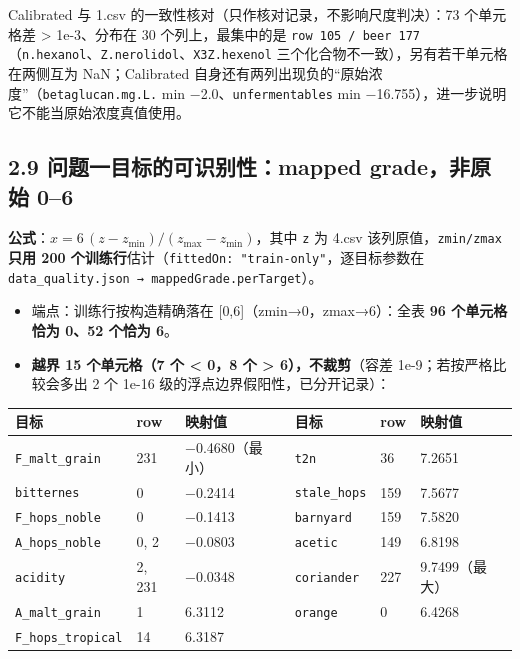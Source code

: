 \documentclass[
  11pt,
]{ctexart}
\newcounter{none} %
\providecommand{\tightlist}{%
  \setlength{\itemsep}{0pt}\setlength{\parskip}{0pt}}
\begin{document}
Calibrated 与 1.csv 的一致性核对（只作核对记录，不影响尺度判决）：73
个单元格差 \textgreater{} 1e-3、分布在 30 个列上，最集中的是
\texttt{row\ 105\ /\allowbreak{}\ beer\ 177}（\texttt{n.hexanol}、\texttt{Z.nerolidol}、\texttt{X3Z.hexenol}
三个化合物不一致），另有若干单元格在两侧互为 NaN；Calibrated
自身还有两列出现负的``原始浓度''（\texttt{betaglucan.\allowbreak{}mg.\allowbreak{}L.\allowbreak{}} min
−2.0、\texttt{unfermentables} min
−16.755），进一步说明它不能当原始浓度真值使用。

\subsection{2.9 问题一目标的可识别性：mapped grade，非原始
0--6}\label{ux95eeux9898ux4e00ux76eeux6807ux7684ux53efux8bc6ux522bux6027mapped-gradeux975eux539fux59cb-06}

\textbf{公式}：\(x = 6\,(z-z_{\min})/(z_{\max}-z_{\min})\)，其中
\texttt{z} 为 4.csv 该列原值，\texttt{zmin/zmax} \textbf{只用 200
个训练行}估计（\texttt{fittedOn:\ "train-only"}，逐目标参数在
\texttt{data\_\allowbreak{}quality.\allowbreak{}json\ →\ mappedGrade.\allowbreak{}perTarget}）。

\begin{itemize}
\tightlist
\item
  端点：训练行按构造精确落在 {[}0,6{]}（zmin→0，zmax→6）：全表
  \textbf{96 个单元格恰为 0、52 个恰为 6}。
\item
  \textbf{越界 15 个单元格（7 个 \textless{} 0，8 个 \textgreater{}
  6），不裁剪}（容差 1e-9；若按严格比较会多出 2 个 1e-16
  级的浮点边界假阳性，已分开记录）：
\end{itemize}

{\def\LTcaptype{none} %
\begin{longtable}[]{@{}llllll@{}}
\toprule\noalign{}
目标 & row & 映射值 & 目标 & row & 映射值 \\
\midrule\noalign{}
\endhead
\bottomrule\noalign{}
\endlastfoot
\texttt{F\_\allowbreak{}malt\_\allowbreak{}grain} & 231 & −0.4680（最小） & \texttt{t2n} & 36 &
7.2651 \\
\texttt{bitternes} & 0 & −0.2414 & \texttt{stale\_hops} & 159 &
7.5677 \\
\texttt{F\_\allowbreak{}hops\_\allowbreak{}noble} & 0 & −0.1413 & \texttt{barnyard} & 159 &
7.5820 \\
\texttt{A\_\allowbreak{}hops\_\allowbreak{}noble} & 0, 2 & −0.0803 & \texttt{acetic} & 149 &
6.8198 \\
\texttt{acidity} & 2, 231 & −0.0348 & \texttt{coriander} & 227 &
9.7499（最大） \\
\texttt{A\_\allowbreak{}malt\_\allowbreak{}grain} & 1 & 6.3112 & \texttt{orange} & 0 & 6.4268 \\
\texttt{F\_\allowbreak{}hops\_\allowbreak{}tropical} & 14 & 6.3187 & & & \\
\end{longtable}
}
\end{document}
